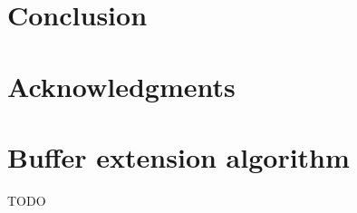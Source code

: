 \documentclass[conference]{IEEEtran}
\begin{document}
\section{Conclusion}

\section{Acknowledgments}




\appendices

\section{Buffer extension algorithm}
\label{bufferExtensionAlgorithm}
TODO
\end{document}
